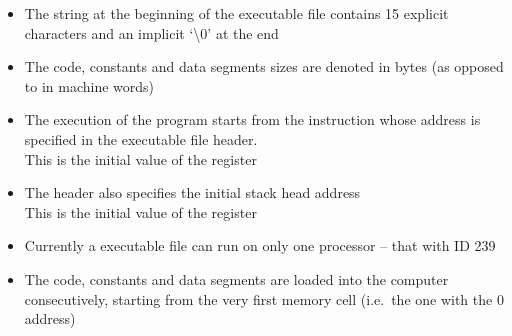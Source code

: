 \begin{itemize}
    \item The  string at the beginning of the executable file contains
    15 explicit characters and an implicit `\textbackslash 0' at the end

    \item The code, constants and data segments sizes are denoted in bytes
    (as opposed to in machine words)

    \item The execution of the program starts from the instruction whose address
    is specified in the executable file header. \\
    This is the initial value of the  register

    \item The header also specifies the initial stack head address \\
    This is the initial value of the  register

    \item Currently a  executable file can run on only one processor
    -- that with ID 239

    \item The code, constants and data segments are loaded into the 
    computer consecutively, starting from the very first memory cell
    (i.e.\ the one with the 0 address)
\end{itemize}
